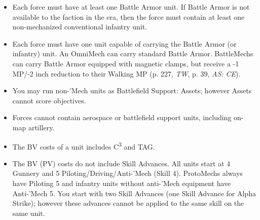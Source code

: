 \begin{itemize}
\item Each force must have at least one Battle Armor unit.
If Battle Armor is not available to the faction in the era, then the force must contain at least one non-mechanized conventional infantry unit.

\item Each force must have one unit capable of carrying the Battle Armor (or infantry) unit.
An OmniMech can carry standard Battle Armor.
BattleMechs can carry Battle Armor equipped with magnetic clamps, but receive a -1 MP/-2 inch reduction to their Walking MP (p. 227, \emph{TW}, p. 39, \emph{AS: CE}).

\item You may run non-'Mech units as Battlefield Support: Assets; however Assets cannot score objectives.

\item Forces cannot contain aerospace or battlefield support units, including on-map artillery.

\item The BV costs of a unit includes C\textsuperscript{3} and TAG.

\item The BV (PV) costs do not include Skill Advances.
All units start at 4 Gunnery and 5 Piloting/Driving/Anti-'Mech (Skill 4).
ProtoMechs always have Piloting 5 and infantry units without anti-'Mech equipment have Anti-'Mech 5.
You start with two Skill Advances (one Skill Advance for Alpha Strike); however these advances cannot be applied to the same skill on the same unit.

\end{itemize}
